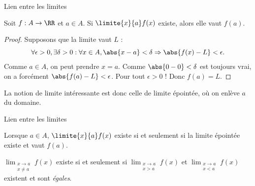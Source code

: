 \begin{frame}{Lien entre les limites}%
  \begin{proposition}
    Soit \(f : A \to \RR\) et \(a \in A\). Si \(\limite{x}{a} f(x)\) existe, alors elle vaut \(f(a)\).
  \end{proposition}
  \begin{proof}\pause
    Supposons que la limite vaut \(L\) :
    \begin{equation*}
      \forall \epsilon > 0, \exists \delta > 0 : \forall x \in A, \abs{x-a} < \delta \Rightarrow \abs{f(x)-L} < \epsilon.
    \end{equation*}
    Comme \(a \in A\), on peut prendre \(x = a\). Comme \(\abs{0 - 0} < \delta\) est toujours vrai, on a forcément \(\abs{f(a) - L} < \epsilon\). Pour tout \(\epsilon > 0\) ! Donc \(f(a) = L\).
  \end{proof}\pause
  \begin{remark}
    La notion de limite intéressante est donc celle de limite épointée, où on enlève \(a\) du domaine.
  \end{remark}
\end{frame}
\begin{frame}{Lien entre les limites}%
\begin{proposition}
    Lorsque \(a \in A\), \(\limite{x}{a} f(x)\) existe si et seulement si la limite épointée existe et vaut \(f(a)\).
  \end{proposition}\pause{}
  \begin{proposition}\label{limites épointées et latérales}
    $\displaystyle\lim_{\substack{x \to a\\ x \neq a}} f(x)$ existe si et seulement si $\displaystyle\lim_{\substack{x \to a\\ x > a}} f(x)$ et $\displaystyle\lim_{\substack{x \to a\\ x < a}} f(x)$ existent et sont \emph{égales}.
  \end{proposition}
\end{frame}

